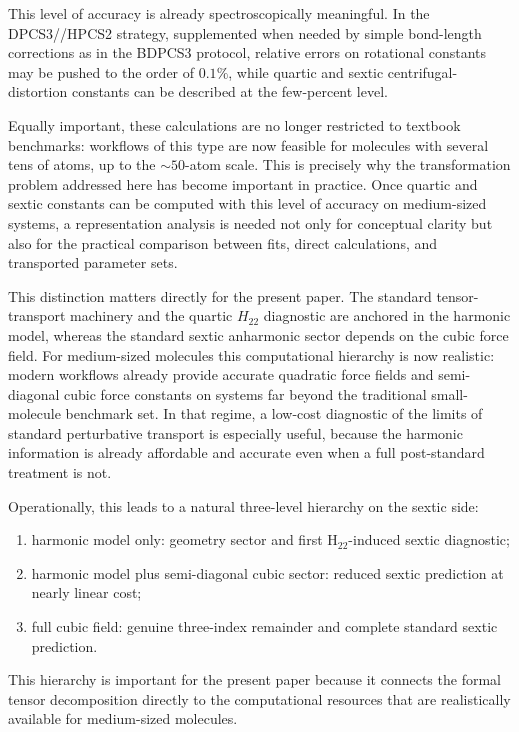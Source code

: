 \documentclass[aip,jcp,reprint,floatfix]{revtex4-2}
\begin{document}
This level of accuracy is already spectroscopically meaningful. In the
DPCS3//HPCS2 strategy, supplemented when needed by simple bond-length
corrections as in the BDPCS3 protocol, relative errors on rotational
constants may be pushed to the order of $0.1\%$,\cite{acr_2026} while 
quartic and sextic centrifugal-distortion constants can be described at 
the few-percent level.\cite{Boussessi_quartic,Boussessi_sextic}

Equally important, these calculations are no longer restricted to textbook
benchmarks: workflows of this type are now feasible for molecules with several
tens of atoms, up to the $\sim 50$-atom scale.\cite{hormones_2024,fast_dvib_2025}
This is precisely why the transformation problem addressed here has become
important in practice. Once quartic and sextic constants can be computed with
this level of accuracy on medium-sized systems, a representation analysis is
needed not only for conceptual clarity but also for the practical comparison
between fits, direct calculations, and transported parameter sets.

This distinction matters directly for the present paper. The standard
tensor-transport machinery and the quartic $H_{22}$ diagnostic are anchored in
the harmonic model, whereas the standard sextic anharmonic sector depends on
the cubic force field. For medium-sized molecules this computational hierarchy
is now realistic: modern workflows already provide accurate quadratic force
fields and semi-diagonal cubic force constants on systems far beyond the
traditional small-molecule benchmark set.\cite{cubic-vib_2024,cubic-internal_2024,fast_dvib_2025,hormones_2024,RotBio_2023,AnnRevPC_2023}
In that regime, a low-cost
diagnostic of the limits of standard perturbative transport is especially
useful, because the harmonic information is already affordable and accurate
even when a full post-standard treatment is not.

Operationally, this leads to a natural three-level hierarchy on the sextic
side:
\begin{enumerate}
\item harmonic model only: geometry sector and first H$_{22}$-induced sextic
diagnostic;
\item harmonic model plus semi-diagonal cubic sector: reduced sextic
prediction at nearly linear cost;
\item full cubic field: genuine three-index remainder and complete standard
sextic prediction.
\end{enumerate}
This hierarchy is important for the present paper because it connects the
formal tensor decomposition directly to the computational resources that are
realistically available for medium-sized molecules.
\end{document}
